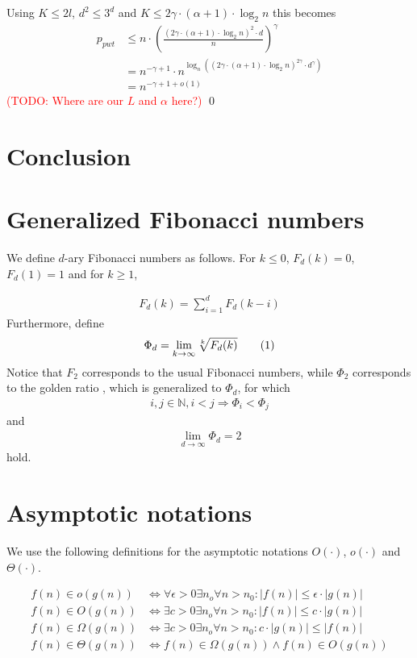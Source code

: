 \documentclass[a4paper,12pt]{article}
\newcommand\todo[1]{\textcolor{red}{(TODO: #1)}}
\newcommand\numberthis{\addtocounter{equation}{1}\tag{\theequation}}
\newcommand\neqn[1]{\numberthis\label{eqn:#1}}
\begin{document}
Using $K \leq 2l$, $d^2 \leq 3^d$ and $K \leq 2\gamma \cdot \left( \alpha +1 \right) \cdot \log_2 n$ this becomes
\begin{align*}
p_{pwt} &\leq n\cdot \left(\frac{\left(2\gamma \cdot \left(\alpha +1 \right) \cdot \log_2 n\right)^2\cdot d}{n}\right)^\gamma \\
        &= n^{-\gamma +1} \cdot n ^{\log_n\left( \left(2\gamma\cdot \left(\alpha+1\right)\cdot \log_2n \right)^{2\gamma} \cdot d^\gamma \right)}\\
        &= n^{-\gamma+1+o\left(1\right)}
\end{align*}
\todo{Where are our $L$ and $\alpha$ here?}
\qed
 
\section{Conclusion}
\label{sec:conclusion}

\appendix
\section{Generalized Fibonacci numbers}
\label{sec:fibonacci}
We define $d$-ary Fibonacci numbers as follows. For $k \leq0$, $F_d(k) = 0$, $F_d(1) = 1$ and for $k \geq 1$,

\begin{align*}
F_d(k) = \sum_{i=1}^{d}F_d(k-i)
\end{align*}
Furthermore, define 
\begin{align*}
\Phi_d = \lim_{k \rightarrow \infty} \sqrt[k]{F_d(k)} \neqn{goldenFib}
\end{align*}
Notice that $F_2$ corresponds to the usual Fibonacci numbers, while $\Phi_2 $ corresponds to the golden ratio \cite{Knuth73}, which is generalized to $\Phi_d$, for which 
\begin{align*}
i, j \in \mathbb{N}, i < j \Rightarrow \Phi_i < \Phi_j
\end{align*}
and 
\begin{align*}
\lim_{d\rightarrow \infty} \Phi_d = 2
\end{align*}
hold.

\section{Asymptotic notations}
\label{sec:asymptotic}
We use the following definitions for the asymptotic notations $O(\cdot)$, $o(\cdot)$ and $\Theta(\cdot)$.

\begin{align*}
f(n) \in o(g(n)) &\Leftrightarrow \forall \epsilon > 0 \exists n_o\forall n> n_0: |f(n)|\leq \epsilon \cdot |g(n)|\\
f(n) \in O(g(n)) &\Leftrightarrow \exists c > 0 \exists n_o\forall n> n_0: |f(n)|\leq c \cdot |g(n)|\\
f(n) \in \Omega(g(n)) &\Leftrightarrow \exists c > 0 \exists n_o\forall n> n_0: c \cdot |g(n)| \leq |f(n)| \\
f(n) \in \Theta(g(n)) &\Leftrightarrow f(n) \in \Omega(g(n)) \land f(n)\in O(g(n))
\end{align*}
\end{document}
